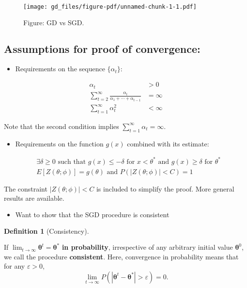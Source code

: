 \documentclass[
  letterpaper,
  DIV=11,
  numbers=noendperiod]{scrreprt}
\providecommand{\tightlist}{%
  \setlength{\itemsep}{0pt}\setlength{\parskip}{0pt}}\usepackage{longtable,booktabs,array}
\theoremstyle{definition}
\theoremstyle{definition}
\newtheorem{definition}{Definition}[chapter]
\theoremstyle{remark}
\begin{document}
\begin{figure}[H]

{\centering \texttt{[image: gd\_files/figure-pdf/unnamed-chunk-1-1.pdf]}

}

\caption{Figure: GD vs SGD.}

\end{figure}%

\subsection{Assumptions for proof of
convergence:}\label{assumptions-for-proof-of-convergence}

\begin{itemize}
\tightlist
\item
  Requirements on the sequence \(\{\alpha_t\}\):
\end{itemize}

\begin{align*}
\alpha_t &> 0\\
\sum_{t=2}^{\infty} \frac{\alpha_t}{\alpha_1 + \cdots + \alpha_{t-1}}&=\infty\\
\sum_{t=1}^{\infty} \alpha_t^2 &< \infty
\end{align*}

Note that the second condition implies
\(\sum_{t=1}^{\infty} \alpha_t = \infty\).

\begin{itemize}
\tightlist
\item
  Requirements on the function \(g(x)\) combined with its estimate:
\end{itemize}

\begin{align*}
&\exists \delta \geq 0 \text{ such that } g(x) \leq -\delta \text{ for } x < \theta^{*} \text { and } g(x) \geq \delta \text{ for } \theta^{*}\\
&E[Z(\theta; \phi)] = g(\theta) \text{ and }P(|Z(\theta; \phi)| < C)=1
\end{align*}

The constraint \(|Z(\theta; \phi)| < C\) is included to simplify the
proof. More general results are available.

\begin{itemize}
\tightlist
\item
  Want to show that the SGD procedure is consistent
\end{itemize}

\begin{definition}[Consistency]\protect\hypertarget{def-consistent}{}\label{def-consistent}

If \(\lim_{t\rightarrow \infty}\pmb{\theta}^t = \pmb{\theta}^{*}\)
\textbf{in probability}, irrespective of any arbitrary initial value
\(\pmb{\theta}^{0}\), we call the procedure \textbf{consistent}. Here,
convergence in probability means that for any \(\varepsilon >0\), \[
\lim_{t\rightarrow\infty}P(|\pmb{\theta}^t - \pmb{\theta}^{*}|>\varepsilon)=0.
\]

\end{definition}
\end{document}
